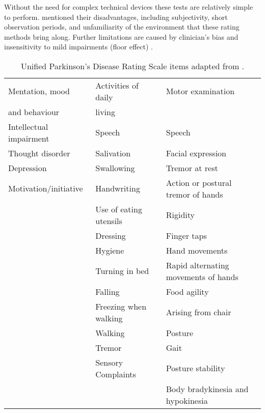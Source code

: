 Without the need for complex technical devices these tests are relatively simple to perform. \citeauthor{klerk_long-term_2009} \cite{klerk_long-term_2009} mentioned their disadvantages, including subjectivity, short observation periods, and unfamiliarity of the environment that these rating methods bring along. Further limitations are caused by clinician's bias and insensitivity to mild impairments (floor effect) \cite{mancini_isway:_2012}.

\begin{table}[h]
\begin{tabular}{lll}
\hline
Mentation, mood & Activities of daily & Motor examination \\
and behaviour & living & \\
\hline
Intellectual impairment & Speech & Speech \\

Thought disorder & Salivation & Facial expression\\

Depression & Swallowing & Tremor at rest \\

Motivation/initiative & Handwriting & Action or postural tremor of hands \\

& Use of eating utensils & Rigidity \\

& Dressing & Finger taps\\

& Hygiene & Hand movements\\

& Turning in bed & Rapid alternating movements of hands\\

& Falling & Food agility\\

& Freezing when walking & Arising from chair \\

& Walking & Posture\\

& Tremor & Gait\\

& Sensory Complaints & Posture stability\\

& & Body bradykinesia and hypokinesia \\
\hline
\end{tabular}
\caption{Unified Parkinson's Disease Rating Scale items adapted from \cite{herndon_handbook_2006}.}
\label{tab:UPDRS}
\end{table}

